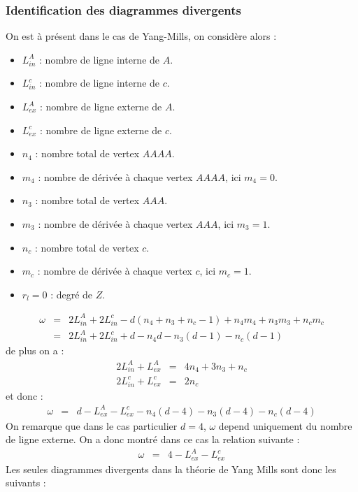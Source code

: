 \documentclass[a4paper,11pt]{article} %
\theoremstyle{plain}
\theoremstyle{definition}
\theoremstyle{remark}
\numberwithin{equation}{section}
\numberwithin{equation}{subsection}
\numberwithin{figure}{section}
\begin{document}
    \subsubsection{Identification des diagrammes divergents}

\noindent
On est à présent  dans le cas de Yang-Mills, on considère alors :
\begin{itemize}
 \item $L^{A}_{in}$ : nombre de ligne interne de $A$.
 \item $L^{c}_{in}$ : nombre de ligne interne de $c$.
 \item $L^{A}_{ex}$ : nombre de ligne externe de $A$.
 \item $L^{c}_{ex}$ : nombre de ligne externe de $c$.
 \item $n_{4}$ : nombre total de vertex $AAAA$.
 \item $m_{4}$ : nombre de dérivée à chaque vertex $AAAA$, ici $m_{4}=0$.
 \item $n_{3}$ : nombre total de vertex $AAA$.
 \item $m_{3}$ : nombre de dérivée à chaque vertex $AAA$, ici $m_{3}=1$.
 \item $n_{c}$ : nombre total de vertex $c$.
 \item $m_{c}$ : nombre de dérivée à chaque vertex $c$, ici $m_{c}=1$.
 \item $r_{l}=0$ : degré de $Z$.
\end{itemize}

\begin{eqnarray*}
 \omega &=& 2L^{A}_{in} + 2L^{c}_{in} - d(n_{4}+n_{3}+n_{c}-1)+ n_{4}m_{4} + n_{3}m_{3} + n_{c}m_{c}\\
        &=& 2L^{A}_{in} + 2L^{c}_{in} + d - n_{4} d -n_{3} (d-1)- n_{c} (d-1)
\end{eqnarray*}
de plus on a :
\begin{eqnarray*}
 2L^{A}_{in} + L^{A}_{ex} &=& 4n_{4}+3n_{3}+n_{c}\\
 2L^{c}_{in} + L^{c}_{ex} &=& 2n_{c}
\end{eqnarray*}
et donc :
\begin{eqnarray*}
 \omega &=& d -L^{A}_{ex}-L^{c}_{ex} - n_{4} (d-4) - n_{3} (d-4) - n_{c} (d-4)
\end{eqnarray*}
On remarque que dans le cas particulier $d=4$, $\omega$ depend uniquement du nombre de ligne externe. On a donc montré dans ce cas 
la relation suivante :
\begin{eqnarray*}
 \omega &=& 4-L^{A}_{ex}-L^{c}_{ex}
\end{eqnarray*}
Les seules diagrammes divergents dans la théorie de Yang Mills sont donc les suivants :
\end{document}
